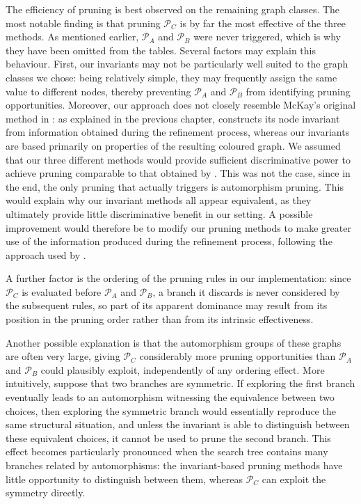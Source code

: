 The efficiency of pruning is best observed on the remaining graph classes. The most notable finding is that pruning $\mathcal{P}_C$ is by far the most effective of the three methods. As mentioned earlier, $\mathcal{P}_A$ and $\mathcal{P}_B$ were never triggered, which is why they have been omitted from the tables. Several factors may explain this behaviour. First, our invariants may not be particularly well suited to the graph classes we chose: being relatively simple, they may frequently assign the same value to different nodes, thereby preventing $\mathcal{P}_A$ and $\mathcal{P}_B$ from identifying pruning opportunities. Moreover, our approach does not closely resemble McKay's original method in \Naut{}: as explained in the previous chapter, \Naut{} constructs its node invariant from information obtained during the refinement process, whereas our invariants are based primarily on properties of the resulting coloured graph. We assumed that our three different methods would provide sufficient discriminative power to achieve pruning comparable to that obtained by \Naut{}. This was not the case, since in the end, the only pruning that actually triggers is automorphism pruning. This would explain why our invariant methods all appear equivalent, as they ultimately provide little discriminative benefit in our setting. A possible improvement would therefore be to modify our pruning methods to make greater use of the information produced during the refinement process, following the approach used by \Naut{}.

A further factor is the ordering of the pruning rules in our implementation: since $\mathcal{P}_C$ is evaluated before $\mathcal{P}_A$ and $\mathcal{P}_B$, a branch it discards is never considered by the subsequent rules, so part of its apparent dominance may result from its position in the pruning order rather than from its intrinsic effectiveness.

Another possible explanation is that the automorphism groups of these graphs are often very large, giving $\mathcal{P}_C$ considerably more pruning opportunities than $\mathcal{P}_A$ and $\mathcal{P}_B$ could plausibly exploit, independently of any ordering effect. More intuitively, suppose that two branches are symmetric. If exploring the first branch eventually leads to an automorphism witnessing the equivalence between two choices, then exploring the symmetric branch would essentially reproduce the same structural situation, and unless the invariant is able to distinguish between these equivalent choices, it cannot be used to prune the second branch. This effect becomes particularly pronounced when the search tree contains many branches related by automorphisms: the invariant-based pruning methods have little opportunity to distinguish between them, whereas $\mathcal{P}_C$ can exploit the symmetry directly.

